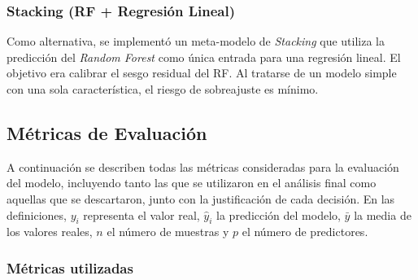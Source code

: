 \documentclass[12pt,a4paper]{article}
\begin{document}
\subsubsection{Stacking (RF + Regresión Lineal)}

Como alternativa, se implementó un meta-modelo de \textit{Stacking} que utiliza la predicción del \textit{Random Forest} como única entrada para una regresión lineal. El objetivo era calibrar el sesgo residual del RF. Al tratarse de un modelo simple con una sola característica, el riesgo de sobreajuste es mínimo.

\subsection{Métricas de Evaluación}
\label{subsec:metricas}

A continuación se describen todas las métricas consideradas para la evaluación del modelo, incluyendo tanto las que se utilizaron en el análisis final como aquellas que se descartaron, junto con la justificación de cada decisión. En las definiciones, $y_i$ representa el valor real, $\hat{y}_i$ la predicción del modelo, $\bar{y}$ la media de los valores reales, $n$ el número de muestras y $p$ el número de predictores.

\subsubsection{Métricas utilizadas}
\end{document}
